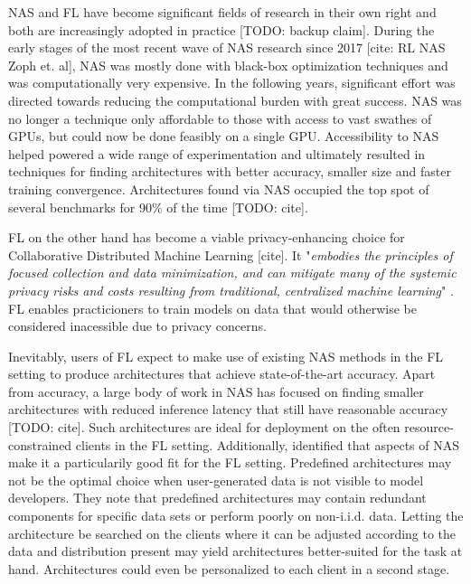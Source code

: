 NAS and FL have become significant fields of research in their own right and both are increasingly adopted in practice [TODO: backup claim]. During the early stages of the most recent wave of NAS research since 2017 [cite: RL NAS Zoph et. al], NAS was mostly done with black-box optimization techniques and was computationally very expensive. In the following years, significant effort was directed towards reducing the computational burden with great success. NAS was no longer a technique only affordable to those with access to vast swathes of GPUs, but could now be done feasibly on a single GPU. Accessibility to NAS helped powered a wide range of experimentation and ultimately resulted in techniques for finding architectures with better accuracy, smaller size and faster training convergence. Architectures found via NAS occupied the top spot of several benchmarks for 90\% of the time [TODO: cite].

FL on the other hand has become a viable privacy-enhancing choice for Collaborative Distributed Machine Learning [cite]. It "\textit{embodies the principles of focused collection and data minimization, and can mitigate many of the systemic privacy risks and costs resulting from traditional, centralized machine learning}" \cite{fl_advances_and_open_problems_2021}. FL enables practicioners to train models on data that would otherwise be considered inacessible due to privacy concerns.  

Inevitably, users of FL expect to make use of existing NAS methods in the FL setting to produce architectures that achieve state-of-the-art accuracy. Apart from accuracy, a large body of work in NAS has focused on finding smaller architectures with reduced inference latency that still have reasonable accuracy [TODO: cite]. Such architectures are ideal for deployment on the often resource-constrained clients in the FL setting. Additionally, \cite{fl_advances_and_open_problems_2021} identified that aspects of NAS make it a particularily good fit for the FL setting. Predefined architectures may not be the optimal choice when user-generated data is not visible to model developers. They note that predefined architectures may contain redundant components for specific data sets or perform poorly on non-i.i.d. data. Letting the architecture be searched on the clients where it can be adjusted according to the data and distribution present may yield architectures better-suited for the task at hand. Architectures could even be personalized to each client in a second stage. 

